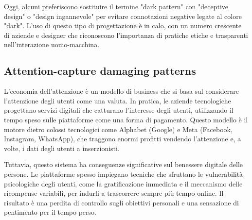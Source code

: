 Oggi, alcuni preferiscono sostituire il termine "dark pattern" con "deceptive design" o "design ingannevole" per evitare connotazioni negative legate al colore "dark". L’uso di questo tipo di progettazione è in calo, con un numero crescente di aziende e designer che riconoscono l’importanza di pratiche etiche e trasparenti nell’interazione uomo-macchina.

\subsection{Attention-capture damaging patterns}
L'economia dell'attenzione è un modello di business che si basa sul considerare l'attenzione degli utenti come una valuta. In pratica, le aziende tecnologiche progettano servizi digitali che catturano l'interesse degli utenti, utilizzando il tempo speso sulle piattaforme come una forma di pagamento. Questo modello è il motore dietro colossi tecnologici come Alphabet (Google) e Meta (Facebook, Instagram, WhatsApp), che traggono enormi profitti vendendo l'attenzione e, a volte, i dati degli utenti a inserzionisti.

Tuttavia, questo sistema ha conseguenze significative sul benessere digitale delle persone. Le piattaforme spesso impiegano tecniche che sfruttano le vulnerabilità psicologiche degli utenti, come la gratificazione immediata e il meccanismo delle ricompense variabili, per indurli a trascorrere sempre più tempo online. Il risultato è una perdita di controllo sugli obiettivi personali e una sensazione di pentimento per il tempo perso.

